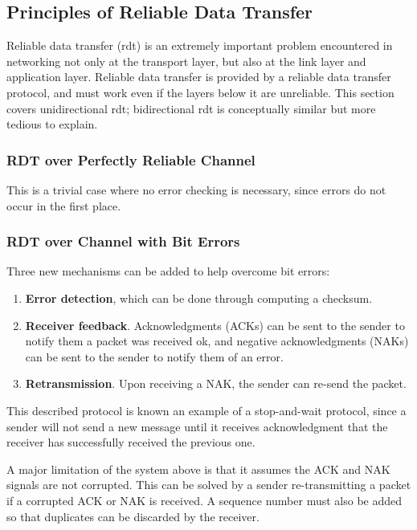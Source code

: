 \documentclass[12pt,titlepage]{article}
\begin{document}
    \subsection{Principles of Reliable Data Transfer}
      Reliable data transfer (rdt) is an extremely important problem encountered in networking not only at the transport layer, but also at the link layer and application layer. Reliable
      data transfer is provided by a reliable data transfer protocol, and must work even if the layers below it are unreliable. This section covers unidirectional rdt; bidirectional rdt
      is conceptually similar but more tedious to explain.

      \subsubsection{RDT over Perfectly Reliable Channel}
        This is a trivial case where no error checking is necessary, since errors do not occur in the first place.

      \subsubsection{RDT over Channel with Bit Errors}
        Three new mechanisms can be added to help overcome bit errors:
        \begin{enumerate}
          \item \textbf{Error detection}, which can be done through computing a checksum.
          \item \textbf{Receiver feedback}. Acknowledgments (ACKs) can be sent to the sender to notify them a packet was received ok, and negative acknowledgments (NAKs) can be sent to the
          sender to notify them of an error.
          \item \textbf{Retransmission}. Upon receiving a NAK, the sender can re-send the packet.
        \end{enumerate}

        This described protocol is known an example of a stop-and-wait protocol, since a sender will not send a new message until it receives acknowledgment that the receiver has
        successfully received the previous one.

        A major limitation of the system above is that it assumes the ACK and NAK signals are not corrupted. This can be solved by a sender re-transmitting a packet if a corrupted ACK or
        NAK is received. A sequence number must also be added so that duplicates can be discarded by the receiver.
\end{document}
